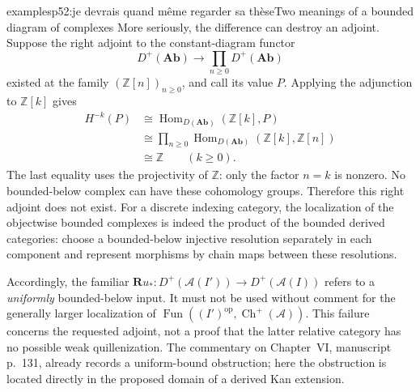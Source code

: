 \begin{dcomment}{examples}{p52:je devrais quand même regarder sa thèse}{Two meanings of a bounded diagram of complexes}
More seriously, the difference can destroy an adjoint. Suppose the right adjoint to the constant-diagram functor
\[
 D^+(\mathbf{Ab})\longrightarrow
 \prod_{n\geq0}D^+(\mathbf{Ab})
\]
existed at the family $(\mathbb Z[n])_{n\geq0}$, and call its value $P$. Applying the adjunction to $\mathbb Z[k]$ gives
\[
 \begin{aligned}
 H^{-k}(P)&\cong\operatorname{Hom}_{D(\mathbf{Ab})}(\mathbb Z[k],P)\\
 &\cong\prod_{n\geq0}
 \operatorname{Hom}_{D(\mathbf{Ab})}(\mathbb Z[k],\mathbb Z[n])\\
 &\cong\mathbb Z\qquad(k\geq0).
 \end{aligned}
\]
The last equality uses the projectivity of $\mathbb Z$: only the factor $n=k$ is nonzero. No bounded-below complex can have these cohomology groups. Therefore this right adjoint does not exist. For a discrete indexing category, the localization of the objectwise bounded complexes is indeed the product of the bounded derived categories: choose a bounded-below injective resolution separately in each component and represent morphisms by chain maps between these resolutions.

Accordingly, the familiar $\mathbf R u_*:D^+(\mathcal A(I'))\to D^+(\mathcal A(I))$ refers to a \emph{uniformly} bounded-below input. It must not be used without comment for the generally larger localization of $\operatorname{Fun}((I')^{\mathrm{op}},\operatorname{Ch}^+(\mathcal A))$. This failure concerns the requested adjoint, not a proof that the latter relative category has no possible weak quillenization. The commentary on Chapter~VI, manuscript p.~131, already records a uniform-bound obstruction; here the obstruction is located directly in the proposed domain of a derived Kan extension.
\end{dcomment}


